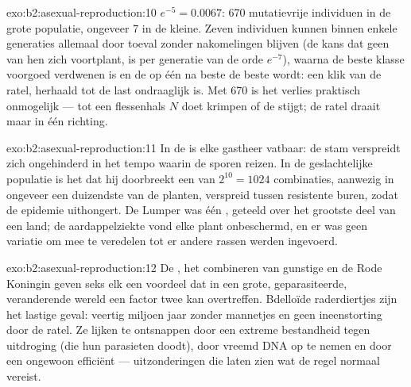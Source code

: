 \begin{solution}{exo:b2:asexual-reproduction:10}
$e^{-5} = 0.0067$: 670 mutatievrije individuen in de grote populatie,
ongeveer 7 in de kleine. Zeven individuen kunnen binnen enkele generaties
allemaal door toeval zonder nakomelingen blijven (de kans dat geen van hen
zich voortplant, is per generatie van de orde $e^{-7}$), waarna de beste
klasse voorgoed verdwenen is en de op één na beste de beste wordt: een
klik van de ratel, herhaald tot de last ondraaglijk is. Met 670 is het
verlies praktisch onmogelijk --- tot een flessenhals $N$ doet krimpen of
de  stijgt; de ratel draait maar in één richting.
\end{solution}

\begin{solution}{exo:b2:asexual-reproduction:11}
In de  is elke gastheer vatbaar: de stam verspreidt zich ongehinderd
in het tempo waarin de sporen reizen. In de geslachtelijke populatie is het
 dat hij doorbreekt een van $2^{10} = 1024$ combinaties, aanwezig
in ongeveer een duizendste van de planten, verspreid tussen resistente
buren, zodat de epidemie uithongert. De Lumper was één , geteeld over
het grootste deel van een land; de aardappelziekte vond elke plant
onbeschermd, en er was geen variatie om mee te veredelen tot er andere
rassen werden ingevoerd.
\end{solution}

\begin{solution}{exo:b2:asexual-reproduction:12}
De , het combineren van gunstige  en de Rode
Koningin geven seks elk een voordeel dat in een grote, geparasiteerde,
veranderende wereld een factor twee kan overtreffen. Bdelloïde
raderdiertjes zijn het lastige geval: veertig miljoen jaar zonder
mannetjes en geen ineenstorting door de ratel. Ze lijken te ontsnappen
door een extreme bestandheid tegen uitdroging (die hun parasieten doodt),
door vreemd DNA op te nemen en door een ongewoon efficiënt  ---
uitzonderingen die laten zien wat de regel normaal vereist.
\end{solution}

